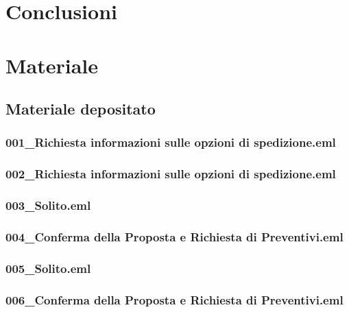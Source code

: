 \documentclass[a4paper,12pt]{report}
\begin{document}
\pagebreak

\chapter{Conclusioni}


\pagebreak

\chapter{Materiale}
\section{Materiale depositato}

\subsection{001\_Richiesta informazioni sulle opzioni di spedizione.eml}
\vspace{5pt}


\subsection{002\_Richiesta informazioni sulle opzioni di spedizione.eml}
\vspace{5pt}


\subsection{003\_Solito.eml}
\vspace{5pt}


\subsection{004\_Conferma della Proposta e Richiesta di Preventivi.eml}
\vspace{5pt}


\subsection{005\_Solito.eml}
\vspace{5pt}


\subsection{006\_Conferma della Proposta e Richiesta di Preventivi.eml}
\vspace{5pt}

\end{document}
